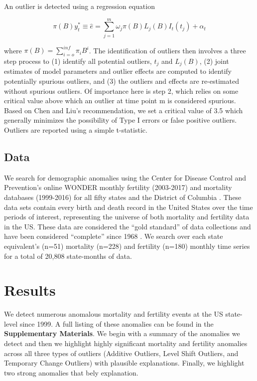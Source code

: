 \documentclass[12pt]{article}
\begin{document}
An outlier is detected using a regression equation

\[ \pi(B)y_t^* \equiv \hat{e} = \sum_{j=1}^m \omega_j \pi(B)L_j(B)I_t(t_j) + \alpha_t \]

where \(\pi(B)=\sum_{i=o}^{inf} \pi_iB^i\). The identification of
outliers then involves a three step process to (1) identify all
potential outliers, \(t_j\) and \(L_j (B)\), (2) joint estimates of
model parameters and outlier effects are computed to identify
potentially spurious outliers, and (3) the outliers and effects are
re-estimated without spurious outliers. Of importance here is step 2,
which relies on some critical value above which an outlier at time point
m is considered spurious. Based on Chen and Liu's
\citeyearpar{chen1993joint} recommendation, we set a critical value of
3.5 which generally minimizes the possibility of Type I errors or false
positive outliers. Outliers are reported using a simple t-statistic.

\hypertarget{data}{%
\subsection{Data}\label{data}}

We search for demographic anomalies using the Center for Disease Control
and Prevention's online WONDER monthly fertility (2003-2017) and
mortality databases (1999-2016) for all fifty states and the District of
Columbia \citep{CDC_fert07, CDC_mort}. These data sets contain every
birth and death record in the United States over the time periods of
interest, representing the universe of both mortality and fertility data
in the US. These data are considered the ``gold standard'' of data
collections \citep{mahapatra2007civil} and have been considered
``complete'' since 1968 \citep{hetzel2016us}. We search over each state
equivalent's (n=51) mortality (n=228) and fertility (n=180) monthly time
series for a total of 20,808 state-months of data.

\hypertarget{results}{%
\section{Results}\label{results}}

We detect numerous anomalous mortality and fertility events at the US
state-level since 1999. A full listing of these anomalies can be found
in the \textbf{Supplementary Materials}. We begin with a summary of the
anomalies we detect and then we highlight highly significant mortality
and fertility anomalies across all three types of outliers (Additive
Outliers, Level Shift Outliers, and Temporary Change Outliers) with
plausible explanations. Finally, we highlight two strong anomalies that
bely explanation.
\end{document}
